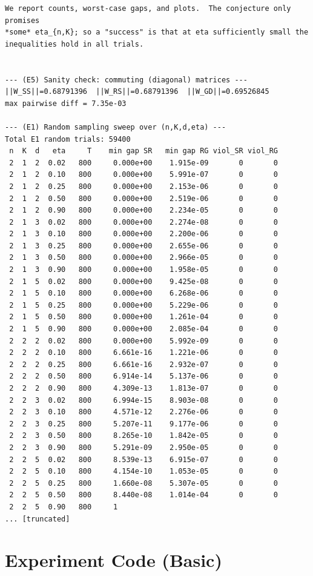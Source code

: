 \documentclass[11pt]{article}
\begin{document}
\begin{lstlisting}
We report counts, worst-case gaps, and plots.  The conjecture only promises
*some* eta_{n,K}; so a "success" is that at eta sufficiently small the
inequalities hold in all trials.


--- (E5) Sanity check: commuting (diagonal) matrices ---
||W_SS||=0.68791396  ||W_RS||=0.68791396  ||W_GD||=0.69526845
max pairwise diff = 7.35e-03

--- (E1) Random sampling sweep over (n,K,d,eta) ---
Total E1 random trials: 59400
 n  K  d   eta     T    min gap SR   min gap RG viol_SR viol_RG
 2  1  2  0.02   800     0.000e+00    1.915e-09       0       0
 2  1  2  0.10   800     0.000e+00    5.991e-07       0       0
 2  1  2  0.25   800     0.000e+00    2.153e-06       0       0
 2  1  2  0.50   800     0.000e+00    2.519e-06       0       0
 2  1  2  0.90   800     0.000e+00    2.234e-05       0       0
 2  1  3  0.02   800     0.000e+00    2.274e-08       0       0
 2  1  3  0.10   800     0.000e+00    2.200e-06       0       0
 2  1  3  0.25   800     0.000e+00    2.655e-06       0       0
 2  1  3  0.50   800     0.000e+00    2.966e-05       0       0
 2  1  3  0.90   800     0.000e+00    1.958e-05       0       0
 2  1  5  0.02   800     0.000e+00    9.425e-08       0       0
 2  1  5  0.10   800     0.000e+00    6.268e-06       0       0
 2  1  5  0.25   800     0.000e+00    5.229e-06       0       0
 2  1  5  0.50   800     0.000e+00    1.261e-04       0       0
 2  1  5  0.90   800     0.000e+00    2.085e-04       0       0
 2  2  2  0.02   800     0.000e+00    5.992e-09       0       0
 2  2  2  0.10   800     6.661e-16    1.221e-06       0       0
 2  2  2  0.25   800     6.661e-16    2.932e-07       0       0
 2  2  2  0.50   800     6.914e-14    5.137e-06       0       0
 2  2  2  0.90   800     4.309e-13    1.813e-07       0       0
 2  2  3  0.02   800     6.994e-15    8.903e-08       0       0
 2  2  3  0.10   800     4.571e-12    2.276e-06       0       0
 2  2  3  0.25   800     5.207e-11    9.177e-06       0       0
 2  2  3  0.50   800     8.265e-10    1.842e-05       0       0
 2  2  3  0.90   800     5.291e-09    2.950e-05       0       0
 2  2  5  0.02   800     8.539e-13    6.915e-07       0       0
 2  2  5  0.10   800     4.154e-10    1.053e-05       0       0
 2  2  5  0.25   800     1.660e-08    5.307e-05       0       0
 2  2  5  0.50   800     8.440e-08    1.014e-04       0       0
 2  2  5  0.90   800     1
... [truncated]
\end{lstlisting}


\section{Experiment Code (Basic)}
\end{document}
